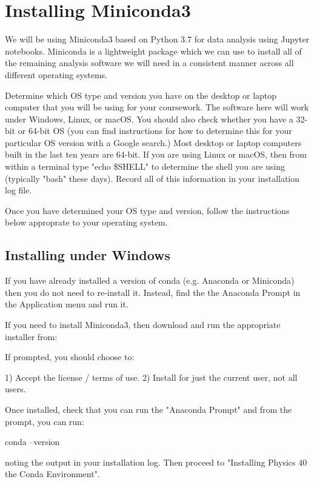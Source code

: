 \section{Installing Miniconda3}

We will be using Miniconda3 based on Python 3.7 for data analysis
using Jupyter notebooks.  Miniconda is a lightweight package which we
can use to install all of the remaining analysis software we will need
in a consistent manner across all different operating systems.

Determine which OS type and version you have on the desktop or laptop
computer that you will be using for your coursework.  The software
here will work under Windows, Linux, or macOS.  You should also check
whether you have a 32-bit or 64-bit OS (you can find instructions for
how to determine this for your particular OS version with a Google
search.)  Most desktop or laptop computers built in the last ten years
are 64-bit.  If you are using Linux or macOS, then from within a
terminal type "echo \$SHELL" to determine the shell you are using
(typically "bash" these days).  Record all of this information in your
installation log file.

Once you have determined your OS type and version, follow the
instructions below approprate to your operating system.

\subsection{Installing under Windows}

If you have already installed a version of conda (e.g. Anaconda or
Miniconda) then you do not need to re-install it.  Instead, find the
the Anaconda Prompt in the Application menu and run it.

If you need to install Miniconda3, then download and run the
appropriate installer from:


If prompted, you should choose to:

1) Accept the license / terms of use.
2) Install for just the current user, not all users.

Once installed, check that you can run the "Anaconda Prompt" and from
the prompt, you can run:

  conda --version

noting the output in your installation log.  Then proceed to
"Installing Physics 40 the Conda Environment".

